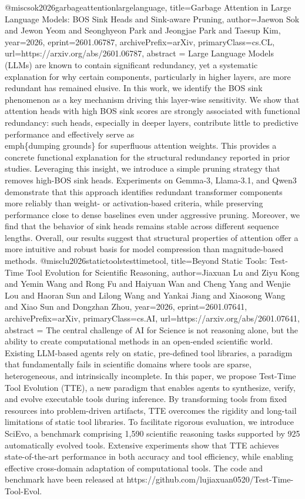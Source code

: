{}@misc{sok2026garbageattentionlargelanguage,
      title={Garbage Attention in Large Language Models: BOS Sink Heads and Sink-aware Pruning}, 
      author={Jaewon Sok and Jewon Yeom and Seonghyeon Park and Jeongjae Park and Taesup Kim},
      year={2026},
      eprint={2601.06787},
      archivePrefix={arXiv},
      primaryClass={cs.CL},
      url={https://arxiv.org/abs/2601.06787},
      abstract = {Large Language Models (LLMs) are known to contain significant redundancy, yet a systematic explanation for why certain components, particularly in higher layers, are more redundant has remained elusive. In this work, we identify the BOS sink phenomenon as a key mechanism driving this layer-wise sensitivity. We show that attention heads with high BOS sink scores are strongly associated with functional redundancy: such heads, especially in deeper layers, contribute little to predictive performance and effectively serve as \\emph\{dumping grounds\} for superfluous attention weights. This provides a concrete functional explanation for the structural redundancy reported in prior studies. Leveraging this insight, we introduce a simple pruning strategy that removes high-BOS sink heads. Experiments on Gemma-3, Llama-3.1, and Qwen3 demonstrate that this approach identifies redundant transformer components more reliably than weight- or activation-based criteria, while preserving performance close to dense baselines even under aggressive pruning. Moreover, we find that the behavior of sink heads remains stable across different sequence lengths. Overall, our results suggest that structural properties of attention offer a more intuitive and robust basis for model compression than magnitude-based methods.}
}@misc{lu2026statictoolstesttimetool,
      title={Beyond Static Tools: Test-Time Tool Evolution for Scientific Reasoning}, 
      author={Jiaxuan Lu and Ziyu Kong and Yemin Wang and Rong Fu and Haiyuan Wan and Cheng Yang and Wenjie Lou and Haoran Sun and Lilong Wang and Yankai Jiang and Xiaosong Wang and Xiao Sun and Dongzhan Zhou},
      year={2026},
      eprint={2601.07641},
      archivePrefix={arXiv},
      primaryClass={cs.AI},
      url={https://arxiv.org/abs/2601.07641},
      abstract = {The central challenge of AI for Science is not reasoning alone, but the ability to create computational methods in an open-ended scientific world. Existing LLM-based agents rely on static, pre-defined tool libraries, a paradigm that fundamentally fails in scientific domains where tools are sparse, heterogeneous, and intrinsically incomplete. In this paper, we propose Test-Time Tool Evolution (TTE), a new paradigm that enables agents to synthesize, verify, and evolve executable tools during inference. By transforming tools from fixed resources into problem-driven artifacts, TTE overcomes the rigidity and long-tail limitations of static tool libraries. To facilitate rigorous evaluation, we introduce SciEvo, a benchmark comprising 1,590 scientific reasoning tasks supported by 925 automatically evolved tools. Extensive experiments show that TTE achieves state-of-the-art performance in both accuracy and tool efficiency, while enabling effective cross-domain adaptation of computational tools. The code and benchmark have been released at https://github.com/lujiaxuan0520/Test-Time-Tool-Evol.}
}
